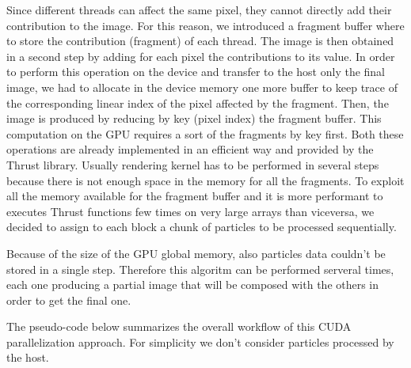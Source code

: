 \documentclass[11pt]{article}
\begin{document}
Since different threads can affect the same pixel, they cannot directly add their contribution to the image. For this reason, we introduced a fragment buffer where to store the contribution (fragment) of each thread. The image is then obtained in a second step by adding for each pixel the contributions to its value. In order to perform this operation on the device and transfer to the host only the final image, we had to allocate in the device memory one more buffer to keep trace of the corresponding linear index of the pixel affected by the fragment. Then, the image is produced by reducing by key (pixel index) the fragment buffer. This computation on the GPU requires a sort of the fragments by key first. Both these operations are already implemented in an efficient way and provided by the Thrust library. Usually rendering kernel has to be performed in several steps because there is not enough space in the memory for all the fragments. To exploit all the memory available for the fragment buffer and it is more performant to executes Thrust functions few times on very large arrays than viceversa, we decided to assign to each block a chunk of particles to be processed sequentially.

Because of the size of the GPU global memory, also particles data couldn't be stored in a single step. Therefore this algoritm can be performed serveral times, each one producing a partial image that will be composed with the others in order to get the final one. 

The pseudo-code below summarizes the overall workflow of this CUDA parallelization approach. For simplicity we don't consider particles processed by the host.
\end{document}
